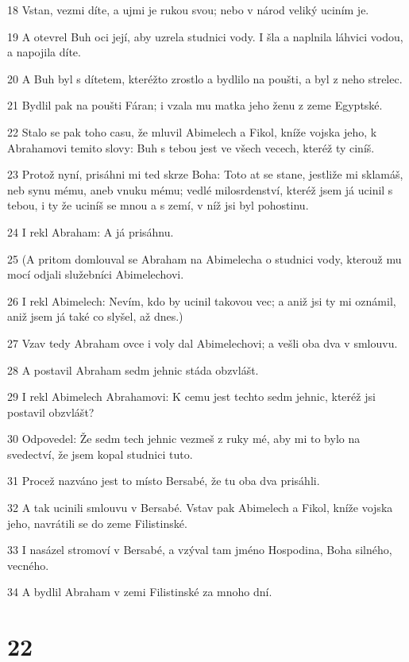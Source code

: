 \par 18 Vstan, vezmi díte, a ujmi je rukou svou; nebo v národ veliký uciním je.
\par 19 A otevrel Buh oci její, aby uzrela studnici vody. I šla a naplnila láhvici vodou, a napojila díte.
\par 20 A Buh byl s dítetem, kteréžto zrostlo a bydlilo na poušti, a byl z neho strelec.
\par 21 Bydlil pak na poušti Fáran; i vzala mu matka jeho ženu z zeme Egyptské.
\par 22 Stalo se pak toho casu, že mluvil Abimelech a Fikol, kníže vojska jeho, k Abrahamovi temito slovy: Buh s tebou jest ve všech vecech, kteréž ty ciníš.
\par 23 Protož nyní, prisáhni mi ted skrze Boha: Toto at se stane, jestliže mi sklamáš, neb synu mému, aneb vnuku mému; vedlé milosrdenství, kteréž jsem já ucinil s tebou, i ty že uciníš se mnou a s zemí, v níž jsi byl pohostinu.
\par 24 I rekl Abraham: A já prisáhnu.
\par 25 (A pritom domlouval se Abraham na Abimelecha o studnici vody, kterouž mu mocí odjali služebníci Abimelechovi.
\par 26 I rekl Abimelech: Nevím, kdo by ucinil takovou vec; a aniž jsi ty mi oznámil, aniž jsem já také co slyšel, až dnes.)
\par 27 Vzav tedy Abraham ovce i voly dal Abimelechovi; a vešli oba dva v smlouvu.
\par 28 A postavil Abraham sedm jehnic stáda obzvlášt.
\par 29 I rekl Abimelech Abrahamovi: K cemu jest techto sedm jehnic, kteréž jsi postavil obzvlášt?
\par 30 Odpovedel: Že sedm tech jehnic vezmeš z ruky mé, aby mi to bylo na svedectví, že jsem kopal studnici tuto.
\par 31 Procež nazváno jest to místo Bersabé, že tu oba dva prisáhli.
\par 32 A tak ucinili smlouvu v Bersabé. Vstav pak Abimelech a Fikol, kníže vojska jeho, navrátili se do zeme Filistinské.
\par 33 I nasázel stromoví v Bersabé, a vzýval tam jméno Hospodina, Boha silného, vecného.
\par 34 A bydlil Abraham v zemi Filistinské za mnoho dní.

\chapter{22}

